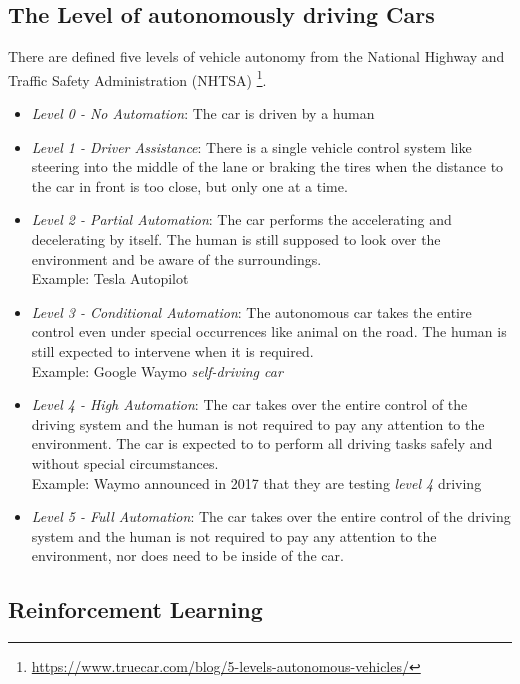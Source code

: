 \documentclass[journal]{IEEEtran}
\begin{document}
\subsection{The Level of autonomously driving Cars}

There are defined five levels of vehicle autonomy from the National Highway and Traffic Safety Administration (NHTSA) \footnote{\url{https://www.truecar.com/blog/5-levels-autonomous-vehicles/}}.

\begin{itemize}
\item \textit{Level 0 - No Automation}: The car is driven by a human
\item \textit{Level 1 - Driver Assistance}: There is a single vehicle control system like steering into the middle of the lane or braking the tires when the distance to the car in front is too close, but only one at a time.
 \item \textit{Level 2 - Partial Automation}: The car performs the accelerating and decelerating by itself. The human is still supposed to look over the environment and be aware of the surroundings. \\
Example: Tesla Autopilot \cite{tesla}	
\item \textit{Level 3 - Conditional Automation}: The autonomous car takes the entire control even under special occurrences like animal on the road. The human is still expected to intervene when it is required. \\
Example: Google Waymo \textit{self-driving car} \cite{google}
\item \textit{Level 4 - High Automation}: The car takes over the entire control of the driving system and the human is not required to pay any attention to the environment. The car is expected to to perform all driving tasks safely and without special circumstances. \\
Example: Waymo announced in 2017 that they are testing \textit{level 4} driving \cite{google2}
\item \textit{Level 5 - Full Automation}: The car takes over the entire control of the driving system and the human is not required to pay any attention to the environment, nor does need to be inside of the car. 



\end{itemize}

\subsection{Reinforcement Learning}
\end{document}
